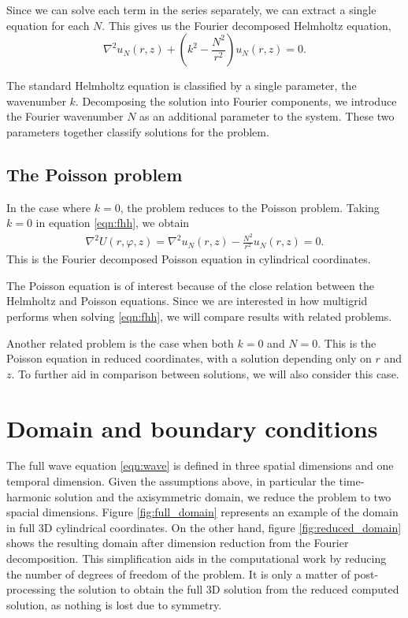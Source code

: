 Since we can solve each term in the series separately, we can extract a single equation for each $N$.
This gives us the Fourier decomposed Helmholtz equation,
\begin{equation}
	\nabla^2 u_N(r,z) + (k^2 - \frac{N^2}{r^2})u_N(r,z) = 0. \label{eqn:fhh}
\end{equation}

The standard Helmholtz equation is classified by a single parameter, the wavenumber $k$.
Decomposing the solution into Fourier components, we introduce the Fourier wavenumber $N$ as an additional parameter to the system.
These two parameters together classify solutions for the problem.



\subsection{The Poisson problem}

In the case where $k=0$, the problem reduces to the Poisson problem.
Taking $k=0$ in equation \eqref{eqn:fhh}, we obtain
\begin{align}
	\nabla^2 U(r,\varphi,z) = \nabla^2 u_N(r,z) - \frac{N^2}{r^2} u_N(r,z) = 0. \label{eqn:fp}
\end{align}
This is the Fourier decomposed Poisson equation in cylindrical coordinates.

The Poisson equation is of interest because of the close relation between the Helmholtz and Poisson equations.
Since we are interested in how multigrid performs when solving \eqref{eqn:fhh}, we will compare results with related problems.

Another related problem is the case when both $k=0$ and $N=0$.
This is the Poisson equation in reduced coordinates, with a solution depending only on $r$ and $z$.
To further aid in comparison between solutions, we will also consider this case.









\section{Domain and boundary conditions}

The full wave equation \eqref{eqn:wave} is defined in three spatial dimensions and one temporal dimension.
Given the assumptions above, in particular the time-harmonic solution and the axisymmetric domain, we reduce the problem to two spacial dimensions.
Figure \ref{fig:full_domain} represents an example of the domain in full 3D cylindrical coordinates.
On the other hand, figure \ref{fig:reduced_domain} shows the resulting domain after dimension reduction from the Fourier decomposition.
This simplification aids in the computational work by reducing the number of degrees of freedom of the problem.
It is only a matter of post-processing the solution to obtain the full 3D solution from the reduced computed solution, as nothing is lost due to symmetry.

